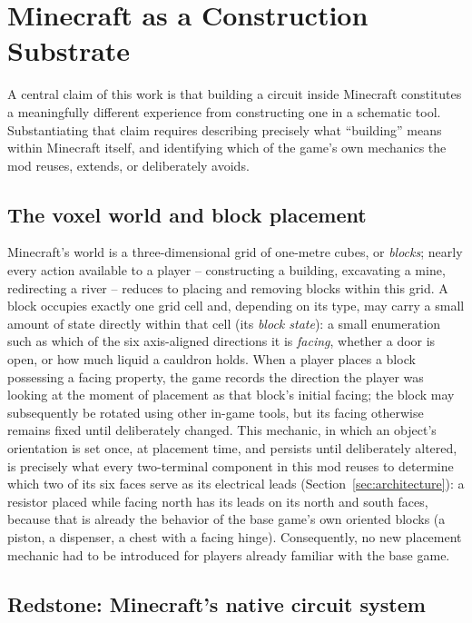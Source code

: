 \section{Minecraft as a Construction Substrate}
\label{sec:minecraft-mechanics}

A central claim of this work is that building a circuit inside Minecraft constitutes a
meaningfully different experience from constructing one in a schematic tool. Substantiating
that claim requires describing precisely what ``building'' means within Minecraft itself,
and identifying which of the game's own mechanics the mod reuses, extends, or deliberately
avoids.

\subsection{The voxel world and block placement}

Minecraft's world is a three-dimensional grid of one-metre cubes, or \emph{blocks}; nearly
every action available to a player -- constructing a building, excavating a mine,
redirecting a river -- reduces to placing and removing blocks within this grid. A block
occupies exactly one grid cell and, depending on its type, may carry a small amount of state
directly within that cell (its \emph{block state}): a small enumeration such as which of the
six axis-aligned directions it is \emph{facing}, whether a door is open, or how much liquid
a cauldron holds. When a player places a block possessing a facing property, the game
records the direction the player was looking at the moment of placement as that block's
initial facing; the block may subsequently be rotated using other in-game tools, but its
facing otherwise remains fixed until deliberately changed. This mechanic, in which an
object's orientation is set once, at placement time, and persists until deliberately
altered, is precisely what every two-terminal component in this mod reuses to determine
which two of its six faces serve as its electrical leads (Section~\ref{sec:architecture}): a
resistor placed while facing north has its leads on its north and south faces, because that
is already the behavior of the base game's own oriented blocks (a piston, a dispenser, a
chest with a facing hinge). Consequently, no new placement mechanic had to be introduced for
players already familiar with the base game.

\subsection{Redstone: Minecraft's native circuit system}

